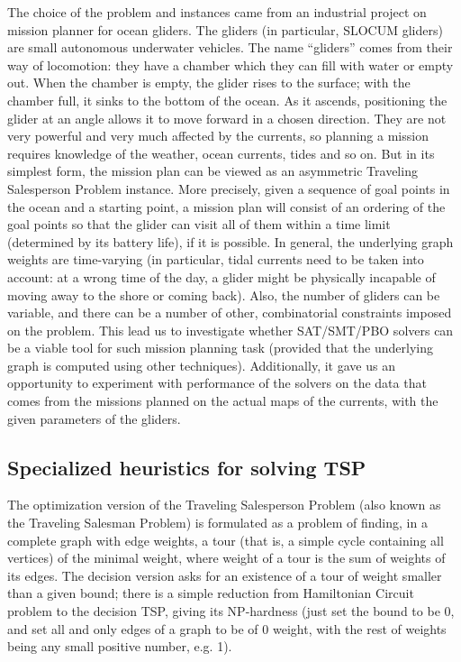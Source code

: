 \documentclass{llncs}
\begin{document}
The choice of the problem and instances came from an industrial project on mission planner for ocean gliders. The gliders (in particular, SLOCUM gliders) are small autonomous underwater vehicles. The name ``gliders'' comes from their way of locomotion: they have a chamber which they can fill with water or empty out. When the chamber is empty, the glider rises to the surface; with the chamber full, it sinks to the bottom of the ocean. As it ascends, positioning the glider at an angle allows it to move forward in a chosen direction.   They are not very powerful and very much affected by the currents, so planning a mission requires knowledge of the weather, ocean currents, tides and so on. But in its simplest form, the mission plan can be viewed as an asymmetric Traveling Salesperson Problem instance. More precisely, given a sequence of  goal points in the ocean and a starting point, a mission plan will consist of an ordering of the goal points so that the glider can visit all of them within a time limit (determined by its battery life), if it is possible.  In general, the underlying graph weights are time-varying (in particular, tidal currents need to be taken into account: at a wrong time of the day, a glider might be physically incapable of moving away to the shore or coming back). Also,  the number of gliders can be variable, and there can be a number of other, combinatorial constraints imposed on the problem. This lead us to investigate whether SAT/SMT/PBO solvers can be a viable tool for such mission planning task (provided that the underlying graph is computed using other techniques).  Additionally, it gave us an opportunity to experiment with performance of the solvers on the data that comes from the missions planned on the actual maps of the currents, with the given parameters of the gliders. 

\subsection{Specialized heuristics for solving TSP}

The optimization version of the Traveling Salesperson Problem (also known as the Traveling Salesman Problem) is formulated as a problem of finding, in a complete graph with edge weights, a tour (that is, a simple cycle containing all vertices) of the minimal weight, where weight of a tour is the sum of weights of its edges.  The decision version asks for an existence of a tour of weight smaller than a given bound; there is a simple reduction from Hamiltonian Circuit problem to the decision TSP, giving its NP-hardness (just set the bound to be 0, and set all and only edges of a graph to be of 0 weight, with the rest of weights being any small positive number, e.g. 1).   
\end{document}

